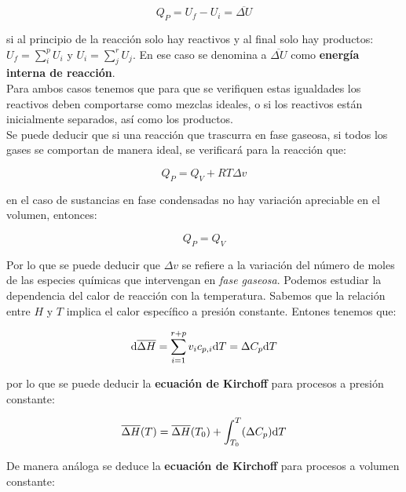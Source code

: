 \documentclass[12pt,a4paper,oneside]{book}
\begin{document}
\begin{equation}
Q_P = U_f - U_i = \overline{\Delta U}
\end{equation}

si al principio de la reacción solo hay reactivos y al final solo hay productos: $U_f = \sum_i^p U_i $  y $U_i = \sum_j^r U_j$. En ese caso se denomina a $\overline{\Delta U}$ como \textbf{energía interna de reacción}. \\



Para ambos casos tenemos que para que se verifiquen estas igualdades los reactivos deben comportarse como mezclas ideales, o si los reactivos están inicialmente separados, así como los productos.\\

Se puede deducir que si una reacción que trascurra en fase gaseosa, si todos los gases se comportan de manera ideal, se verificará para la reacción que:

\begin{equation}
Q_P = Q_V + RT \Delta v
\end{equation}

en el caso de sustancias en fase condensadas no hay variación apreciable en el volumen, entonces:

\begin{equation}
Q_P = Q_V
\end{equation}

Por lo que se puede deducir que $\Delta v$ se refiere a la variación del número de moles de las especies químicas que intervengan en \textit{fase gaseosa}. Podemos estudiar la dependencia del calor de reacción con la temperatura. Sabemos que la relación entre $H$ y $T$ implica el calor específico a presión constante. Entones tenemos que:

\begin{equation}
\mathrm{d} \overline{\Delta H} = \sum_{i=1}^{r+p} v_ i c_{p,i} \mathrm{d} T = \Delta C_p \mathrm{d} T
\end{equation}

por lo que se puede deducir la \textbf{ecuación de Kirchoff} para procesos a presión constante:

\begin{equation}
\overline{\Delta H} (T) = \overline{\Delta H} (T_0) + \int_{T_0}^T (\Delta C_p) \mathrm{d} T
\end{equation}

De manera análoga se deduce la \textbf{ecuación de Kirchoff} para procesos a volumen constante:
\end{document}
